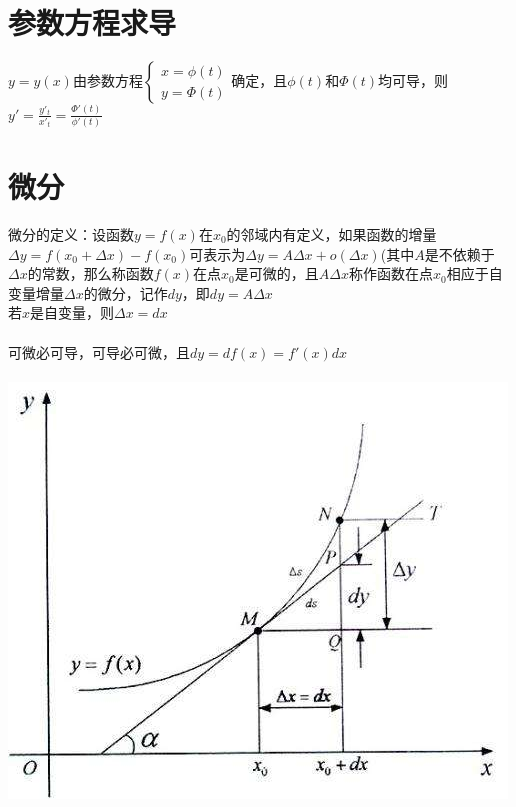 \documentclass{article}
\begin{document}
\begin{flushleft}
	\section{参数方程求导}
	
	$y=y(x)$由参数方程$\left\{
	\begin{array}{rcl}
	x=\phi(t)\\
	y=\Phi(t)
	\end{array} \right.$确定，且$\phi(t)$和$\Phi(t)$均可导，则$y'=\frac{y'_t}{x'_t}=\frac{\Phi'(t)}{\phi'(t)}$\\
	
	\section{微分}
	
	微分的定义：设函数$y=f(x)$在$x_0$的邻域内有定义，如果函数的增量$\Delta y = f(x_0 + \Delta x) − f(x_0)$可表示为$ \Delta y = A\Delta x + o(\Delta x)$(其中$A$是不依赖于$\Delta x$的常数，那么称函数$f(x)$在点$x_0$是可微的，且$A\Delta x$称作函数在点$x_0$相应于自变量增量$\Delta x$的微分，记作$dy$，即$dy = A\Delta x$\\
	若$x$是自变量，则$\Delta x=dx$\\
	~\\
	可微必可导，可导必可微，且$dy=df(x)=f'(x)dx$\\
	~\\
	\includegraphics[scale=1.0]{1.jpg}
	
\end{flushleft}
\end{document}
